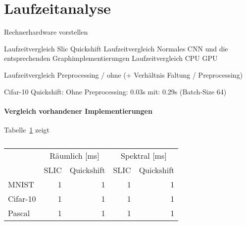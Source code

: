 \section{Laufzeitanalyse}
\label{laufzeitanalyse}

Rechnerhardware vorstellen

Laufzeitvergleich Slic Quickshift
Laufzeitvergleich Normales CNN und die entsprechenden Graphimplementierungen
Laufzeitvergleich CPU GPU

Laufzeitvergleich Preprocessing / ohne (+ Verhältnis Faltung / Preprocessing)

Cifar-10 Quickshift: Ohne Preprocessing: 0.03s
mit: 0.29s (Batch-Size 64)




\paragraph{Vergleich \bzgl{} vorhandener Implementierungen}
\label{vergleich_laufzeit}



Tabelle~\ref{tab:laufzeit_raeumlich_spektral} zeigt
\begin{table}[t]
\centering
\begin{tabular}{lrrrr}
  \toprule
  & \multicolumn{2}{c}{Räumlich [ms]} & \multicolumn{2}{c}{Spektral [ms]}\\
  \cmidrule{2-5}
  & \gls{SLIC} & Quickshift & \gls{SLIC} & Quickshift\\
  \midrule
  \gls{MNIST} & 1 & 1 & 1 & 1\\
  \gls{Cifar}-10 & 1 & 1 & 1 & 1\\
  \gls{Pascal} & 1 & 1 & 1 & 1\\
  \bottomrule
\end{tabular}
\caption[Laufzeiten der räumlichen und spektralen Vorverarbeitungsschritte]{}
\label{tab:laufzeit_raeumlich_spektral}
\end{table}

